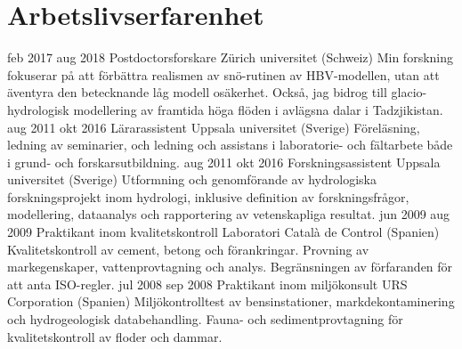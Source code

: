 \ifswedish
    \section{Arbetslivserfarenhet}
        \position
            {feb 2017 \textemdash{} aug 2018}
            {Postdoctorsforskare}
            {Zürich universitet (Schweiz)}
            {Min forskning fokuserar på att förbättra realismen av snö-rutinen av HBV-modellen, utan att äventyra den betecknande låg modell osäkerhet. Också, jag bidrog till glacio-hydrologisk modellering av framtida höga flöden i avlägsna dalar i Tadzjikistan.}
        \position
            {aug 2011 \textemdash{} okt 2016}
            {Lärarassistent}
            {Uppsala universitet (Sverige)}
            {Föreläsning, ledning av seminarier, och ledning och assistans i laboratorie- och fältarbete både i grund- och forskarsutbildning.}
        \position
            {aug 2011 \textemdash{} okt 2016}
            {Forskningsassistent}
            {Uppsala universitet (Sverige)}
            {Utformning och genomförande av hydrologiska forskningsprojekt inom hydrologi, inklusive definition av forskningsfrågor, modellering, dataanalys och rapportering av vetenskapliga resultat.}
        \position
            {jun 2009 \textemdash{} aug 2009}
            {Praktikant inom kvalitetskontroll}
            {Laboratori Català de Control (Spanien)}
            {Kvalitetskontroll av cement, betong och förankringar. Provning av markegenskaper, vattenprovtagning och analys. Begränsningen av förfaranden för att anta ISO-regler.}
        \position
            {jul 2008 \textemdash{} sep 2008}
            {Praktikant inom miljökonsult}
            {URS Corporation (Spanien)}
            {Miljökontrolltest av bensinstationer, markdekontaminering och hydrogeologisk databehandling. Fauna- och sedimentprovtagning för kvalitetskontroll av floder och dammar.}
\else
